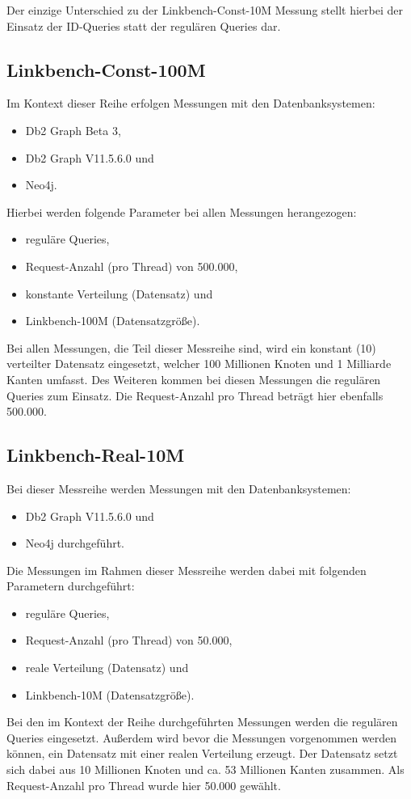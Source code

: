 Der einzige Unterschied zu der Linkbench-Const-10M Messung stellt hierbei der Einsatz der ID-Queries statt der regulären Queries dar.

\subsection{Linkbench-Const-100M}
Im Kontext dieser Reihe erfolgen Messungen mit den Datenbanksystemen:
\begin{itemize}
    \item Db2 Graph Beta 3,
    \item Db2 Graph V11.5.6.0 und 
    \item Neo4j. 
\end{itemize}

Hierbei werden folgende Parameter bei allen Messungen herangezogen:
\begin{itemize}
    \item reguläre Queries,
    \item Request-Anzahl (pro Thread) von 500.000, 
    \item konstante Verteilung (Datensatz) und
    \item Linkbench-100M (Datensatzgröße).
\end{itemize}
Bei allen Messungen, die Teil dieser Messreihe sind, wird ein konstant (10) verteilter Datensatz eingesetzt, welcher 100 Millionen Knoten und 1 Milliarde Kanten umfasst. Des Weiteren kommen bei diesen Messungen die regulären Queries zum Einsatz. Die Request-Anzahl pro Thread beträgt hier ebenfalls 500.000.

\subsection{Linkbench-Real-10M}
Bei dieser Messreihe werden Messungen mit den Datenbanksystemen:
\begin{itemize}
    \item Db2 Graph V11.5.6.0 und 
    \item Neo4j durchgeführt. 
\end{itemize}

Die Messungen im Rahmen dieser Messreihe werden dabei mit folgenden Parametern durchgeführt:
\begin{itemize}
    \item reguläre Queries,
    \item Request-Anzahl (pro Thread) von 50.000, 
    \item reale Verteilung (Datensatz) und 
    \item Linkbench-10M (Datensatzgröße).
\end{itemize}
Bei den im Kontext der Reihe durchgeführten Messungen werden die regulären Queries eingesetzt. Außerdem wird bevor die Messungen vorgenommen werden können, ein Datensatz mit einer realen Verteilung erzeugt. Der Datensatz setzt sich dabei aus 10 Millionen Knoten und ca. 53 Millionen Kanten zusammen. Als Request-Anzahl pro Thread wurde hier 50.000 gewählt. 

